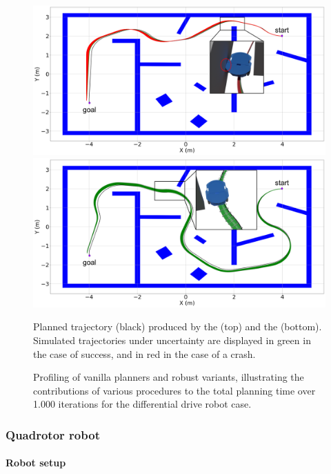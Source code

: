 \begin{figure} [H]
    \centering
    \includegraphics[width=0.9\linewidth]{figures/samp/non_robust_unic.png}
    \includegraphics[width=0.9\linewidth]{figures/samp/robust_unic.png}
    \caption{Planned trajectory (black) produced by the  (top) and the  (bottom). 
    Simulated trajectories under uncertainty are displayed in green in the case of success, and in red in the case of a crash.}%
    \label{fig:robust_unic}%
\end{figure}

\begin{figure} [H]
    \centering
     
    \caption{Profiling of vanilla planners and robust  variants, illustrating the contributions of various procedures to the total planning time over 1.000 iterations for the differential drive robot case.}%
    \label{fig:profiling_unic}%
\end{figure}

\subsubsection{Quadrotor robot}\label{sec:quad_setup_samp}

\paragraph{Robot setup}


